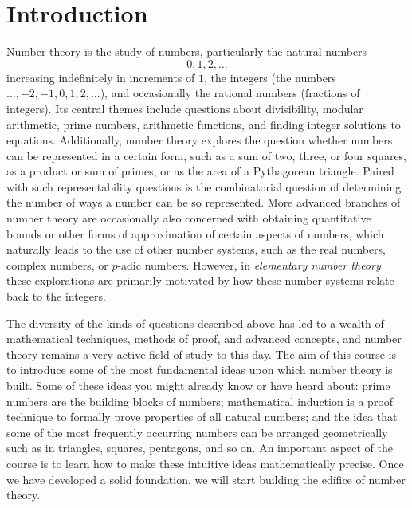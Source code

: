 \chapter{Introduction}\label{chapter:introduction}

Number theory is the study of numbers, particularly the natural numbers
\begin{equation*}
  0,1,2,\ldots
\end{equation*}
increasing indefinitely in increments of $1$, the integers (the numbers $\ldots, -2, -1, 0, 1, 2, \ldots$), and occasionally the rational numbers (fractions of integers). Its central themes include questions about divisibility, modular arithmetic, prime numbers, arithmetic functions, and finding integer solutions to equations. Additionally, number theory explores the question whether numbers can be represented in a certain form, such as a sum of two, three, or four squares, as a product or sum of primes, or as the area of a Pythagorean triangle. Paired with such representability questions is the combinatorial question of determining the number of ways a number can be so represented. More advanced branches of number theory are occasionally also concerned with obtaining quantitative bounds or other forms of approximation of certain aspects of numbers, which naturally leads to the use of other number systems, such as the real numbers, complex numbers, or $p$-adic numbers. However, in \emph{elementary number theory} these explorations are primarily motivated by how these number systems relate back to the integers.

The diversity of the kinds of questions described above has led to a wealth of mathematical techniques, methods of proof, and advanced concepts, and number theory remains a very active field of study to this day. The aim of this course is to introduce some of the most fundamental ideas upon which number theory is built. Some of these ideas you might already know or have heard about: prime numbers are the building blocks of numbers; mathematical induction is a proof technique to formally prove properties of all natural numbers; and the idea that some of the most frequently occurring numbers can be arranged geometrically such as in triangles, squares, pentagons, and so on. An important aspect of the course is to learn how to make these intuitive ideas mathematically precise. Once we have developed a solid foundation, we will start building the edifice of number theory.

